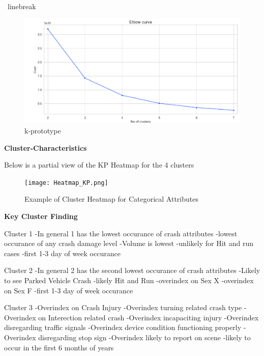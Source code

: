 \documentclass[conference]{IEEEtran}
\begin{document}
\begin{center}
\ linebreak
 \begin{figure}[!h]
	\includegraphics[width=\linewidth]{KPrototype_Elbow.png}
	\caption{k-prototype}
	\label{fig: kprototype elbow chart}
 \end{figure}

\textbf{Cluster-Characteristics} \linebreak

Below is a partial view of the KP Heatmap for the 4 clusters

\begin{figure}[!h]
	\texttt{[image: Heatmap\_KP.png]}
	\caption{Example of Cluster Heatmap for Categorical Attributes }
	\label{fig: Cluster Heatmap for Categorical Attributes (4 Clusters)}
\end{figure}

\begin{center} 
	\textbf{Key Cluster Finding} 
	\end{center}


Cluster 1 \linebreak
-In general 1 has the lowest occurance of crash attributes 
-lowest occurance of any crash damage level 
-Volume is lowest 
-unlikely for Hit and run cases 
-first 1-3 day of week occurance 

Cluster 2 \linebreak
-In general 2 has the second lowest occurance of crash attributes
-Likely to see Parked Vehicle Crash
-likely Hit and Run
-overindex on Sex X
-overindex on Sex F
-first 1-3 day of week occurance

Cluster 3 \linebreak
-Overindex on Crash Injury
-Overindex turning related crash type
-Overindex on Interection related crash
-Overindex incapaciting injury
-Overindex disregarding traffic signals
-Overindex device condition functioning properly
-Overindex disregarding stop sign
-Overindex likely to report on scene
-likely to occur in the first 6 months of years


\end{center}
\end{document}
